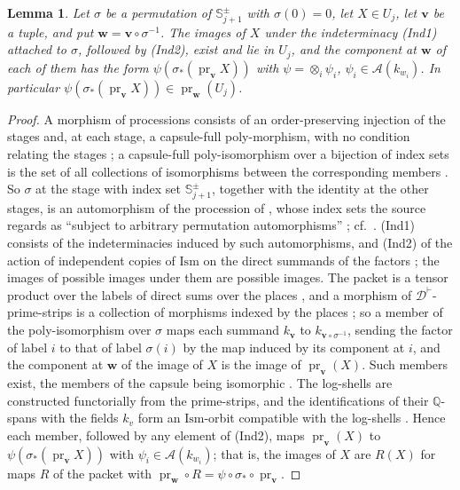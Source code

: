 \documentclass[11pt]{amsart}
\newtheorem{lemma}[theorem]{Lemma}
\theoremstyle{remark}
\newcommand{\Q}{\mathbb Q}
\newcommand{\cA}{\mathcal A}
\newcommand{\pr}{\operatorname{pr}}
\newcommand{\Sj}{\mathbb S^{\pm}_{j+1}}
\newcommand{\bv}{\mathbf v}
\newcommand{\bw}{\mathbf w}
\begin{document}
\begin{lemma}\label{l:transport}
Let $\sigma$ be a permutation of $\Sj$ with $\sigma(0)=0$, let $X\in U_j$, let $\bv$ be a tuple, and put
$\bw=\bv\circ\sigma^{-1}$. The images of $X$ under the indeterminacy (Ind1) attached to $\sigma$, followed by (Ind2),
exist and lie in $U_j$, and the component at $\bw$ of each of them has the form $\psi(\sigma_*(\pr_{\bv}X))$ with
$\psi=\otimes_i\psi_i$, $\psi_i\in\cA(k_{w_i})$. In particular $\psi(\sigma_*(\pr_{\bv}X))\in\pr_{\bw}(U_j)$.
\end{lemma}

\begin{proof}
A morphism of processions consists of an order-preserving injection of the stages and, at each stage, a
capsule-full poly-morphism, with no condition relating the stages \cite[Def.~4.10, p.~120]{IUT1}; a capsule-full
poly-isomorphism over a bijection of index sets is the set of all collections of isomorphisms between the
corresponding members \cite[\S0, p.~34]{IUT1}. So $\sigma$ at the stage with index set $\Sj$, together with the
identity at the other stages, is an automorphism of the procession of \cite[Thm.~3.11(i)]{IUT3}, whose index sets
the source regards as ``subject to arbitrary permutation automorphisms'' \cite[p.~10]{IUT3}; cf.\
\cite[Prop.~6.9(i), p.~169]{IUT1}. (Ind1) consists of the indeterminacies induced by such automorphisms, and
(Ind2) of the action of independent copies of $\mathrm{Ism}$ on the direct summands of the factors
\cite[Thm.~3.11(i), p.~154]{IUT3}; the images of possible images under them are possible images. The packet is a
tensor product over the labels of direct sums over the places \cite[Prop.~3.2]{IUT3}, and a morphism of
$\mathcal D^{\vdash}$-prime-strips is a collection of morphisms indexed by the places \cite[Def.~4.1(iv),
p.~96]{IUT1}; so a member of the poly-isomorphism over $\sigma$ maps each summand $k_{\bv}$ to
$k_{\bv\circ\sigma^{-1}}$, sending the factor of label $i$ to that of label $\sigma(i)$ by the map induced by its
component at $i$, and the component at $\bw$ of the image of $X$ is the image of $\pr_{\bv}(X)$. Such members exist,
the members of the capsule being isomorphic \cite[Def.~4.1(iii)]{IUT1}. The log-shells are constructed functorially
from the prime-strips, and the identifications of their $\Q$-spans with the fields $k_v$ form an $\mathrm{Ism}$-orbit
compatible with the log-shells \cite[Prop.~1.2(vi), p.~32]{IUT3}. Hence each member, followed by any element of
(Ind2), maps $\pr_{\bv}(X)$ to $\psi(\sigma_*(\pr_{\bv}X))$ with $\psi_i\in\cA(k_{w_i})$; that is, the images of $X$
are $R(X)$ for maps $R$ of the packet with $\pr_{\bw}\circ R=\psi\circ\sigma_*\circ\pr_{\bv}$.
\end{proof}
\end{document}
